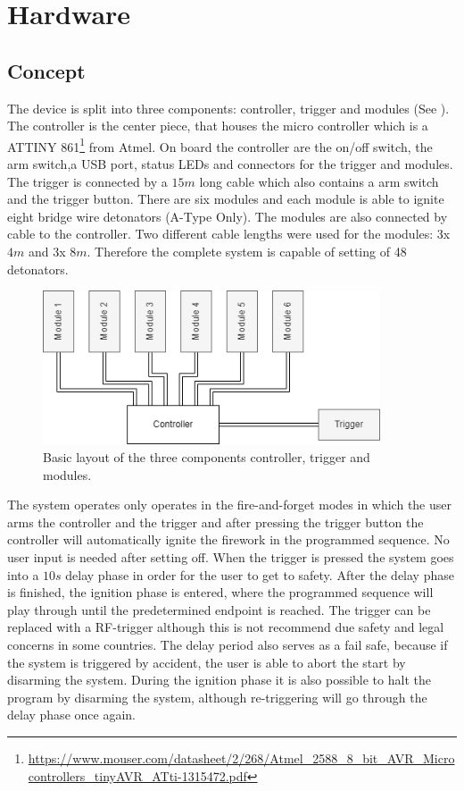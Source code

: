 \pagebreak

\section{Hardware}
\label{Hardware}

\subsection{Concept}
\label{Concept}
The device is split into three components: controller, trigger and modules (See ). The controller is the center piece, that houses the micro controller which is a ATTINY 861\footnote{\url{https://www.mouser.com/datasheet/2/268/Atmel_2588_8_bit_AVR_Microcontrollers_tinyAVR_ATti-1315472.pdf}} from Atmel. On board the controller are the on/off switch, the arm switch,a USB port, status LEDs and connectors for the trigger and modules. The trigger is connected by a $15m$ long cable which also contains a arm switch and the trigger button. There are six modules and each module is able to ignite eight bridge wire detonators (A-Type Only). The modules are also connected by cable to the controller. Two different cable lengths were used for the modules: 3x $4m$ and 3x $8m$. Therefore the complete system is capable of setting of 48 detonators.

\begin{figure}[!ht]
    \centering
    \includegraphics[width=10cm]{./Figures/concept.png}
    \caption{Basic layout of the three components controller, trigger and modules.}
    \label{fig:concept}     
\end{figure}

\noindent The system operates only operates in the fire-and-forget modes in which the user arms the controller and the trigger and after pressing the trigger button the controller will automatically ignite the firework in the programmed sequence. No user input is needed after setting off. When the trigger is pressed the system goes into a $10s$ delay phase in order for the user to get to safety. After the delay phase is finished, the ignition phase is entered, where the programmed sequence will play through until the predetermined endpoint is reached. The trigger can be replaced with a RF-trigger although this is not recommend due safety and legal concerns in some countries. The delay period also serves as a fail safe, because if the system is triggered by accident, the user is able to abort the start by disarming the system. During the ignition phase it is also possible to halt the program by disarming the system, although re-triggering will go through the delay phase once again.\\



